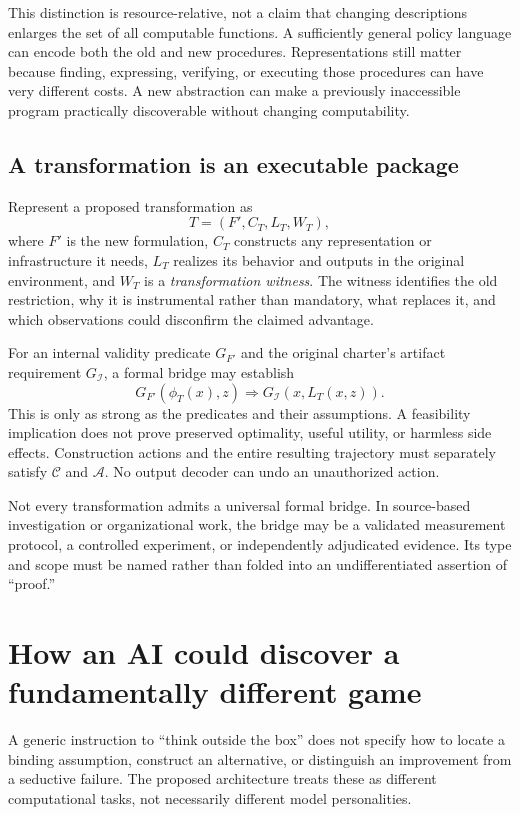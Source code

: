 \documentclass[11pt,letterpaper]{article}
\newcommand{\I}{\mathcal I}
\newcommand{\A}{\mathcal A}
\theoremstyle{remark}\newtheorem{remark}{Remark}[section]
\begin{document}
This distinction is resource-relative, not a claim that changing descriptions enlarges the set of all computable functions. A sufficiently general policy language can encode both the old and new procedures. Representations still matter because finding, expressing, verifying, or executing those procedures can have very different costs. A new abstraction can make a previously inaccessible program practically discoverable without changing computability.

\subsection{A transformation is an executable package}
Represent a proposed transformation as
\begin{equation}
T=(F',C_T,L_T,W_T),\label{eq:package}
\end{equation}
where $F'$ is the new formulation, $C_T$ constructs any representation or infrastructure it needs, $L_T$ realizes its behavior and outputs in the original environment, and $W_T$ is a \emph{transformation witness}. The witness identifies the old restriction, why it is instrumental rather than mandatory, what replaces it, and which observations could disconfirm the claimed advantage.

For an internal validity predicate $G_{F'}$ and the original charter's artifact requirement $G_\I$, a formal bridge may establish
\begin{equation}
G_{F'}(\phi_T(x),z)\Longrightarrow G_\I(x,L_T(x,z)).\label{eq:bridge}
\end{equation}
This is only as strong as the predicates and their assumptions. A feasibility implication does not prove preserved optimality, useful utility, or harmless side effects. Construction actions and the entire resulting trajectory must separately satisfy $\mathcal C$ and $\A$. No output decoder can undo an unauthorized action.

Not every transformation admits a universal formal bridge. In source-based investigation or organizational work, the bridge may be a validated measurement protocol, a controlled experiment, or independently adjudicated evidence. Its type and scope must be named rather than folded into an undifferentiated assertion of ``proof.''

\section{How an AI could discover a fundamentally different game}
\label{sec:architecture}
A generic instruction to ``think outside the box'' does not specify how to locate a binding assumption, construct an alternative, or distinguish an improvement from a seductive failure. The proposed architecture treats these as different computational tasks, not necessarily different model personalities.
\end{document}
